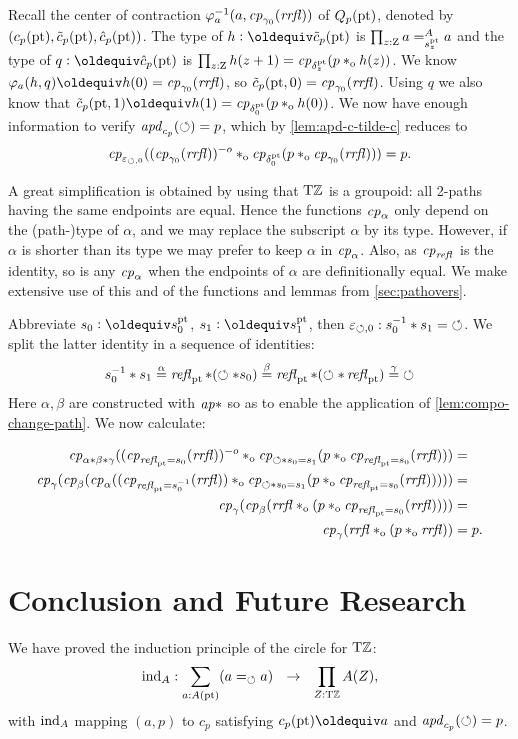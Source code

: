 \documentclass[a4paper,12pt]{amsart}
\begin{document}
Recall the center of contraction $\varphi_{a}^{-1}(a,\mathit{cp}_{\gamma_0}(\mathit{rrfl}))$
of $Q_p({\mathord{\mathrm{pt}}})$, denoted by $(c_p({\mathord{\mathrm{pt}}}),\tilde{c}_p({\mathord{\mathrm{pt}}}),\hat{c}_p({\mathord{\mathrm{pt}}}))$.
The type of $h\defeq\tilde{c}_p(\pt)$ is $\prod_{z:\mathrm{Z}} a =^A_{s^{\mathord{\mathrm{pt}}}_z} a$ and
the type of $q\defeq\hat{c}_p(\pt)$ is $\prod_{z:\mathrm{Z}} h(z+1) = \mathit{cp}_{\delta^{\mathord{\mathrm{pt}}}_z}(p *_{\mathrm{o}} h(z))$.
We know $\varphi_{a}(h,q) \jdeq h(0) = \cp{\gamma_0}(\rrfl)$, 
so $\tilde c_p({\mathord{\mathrm{pt}}},0) = \mathit{cp}_{\gamma_0}(\mathit{rrfl})$.
Using $q$ we also know that 
$\tilde c_p(\pt,1) \jdeq h(1) = \cp{\delta^\pt_0}(p \cto h(0))$.
We now have enough information to verify $\mathop{{\it apd}_{c_p}}(\circlearrowleft)=p$,
which by \cref{lem:apd-c-tilde-c} reduces to 
\[
\mathit{cp}_{\varepsilon_{\circlearrowleft,0}}
((\mathit{cp}_{\gamma_0}(\mathit{rrfl}))^{-o}*_{\mathrm{o}} 
\mathit{cp}_{\delta^{\mathord{\mathrm{pt}}}_0}(p *_{\mathrm{o}} \mathit{cp}_{\gamma_0}(\mathit{rrfl}))) = p.
\]

A great simplification is obtained by using that ${\mathrm{T}\mathbb{Z}}$ is a groupoid:
all 2-paths having the same endpoints are equal.
Hence the functions $\mathit{cp}_{\alpha}$ only depend on the (path-)type
of $\alpha$, and we may replace the subscript $\alpha$ by its type.
However, if $\alpha$ is shorter than its type we may 
prefer to keep $\alpha$ in $\mathit{cp}_{\alpha}$.
Also, as $\mathit{cp}_{\mathop{{\it refl}_{}}}$ is the identity, so is any $\mathit{cp}_{\alpha}$
when the endpoints of $\alpha$ are definitionally equal. 
We make extensive use of this and of the functions and
lemmas from \cref{sec:pathovers}.

Abbreviate $s_0 \defeq s^\pt_0$, $s_1 \defeq s^\pt_1$, 
then $\varepsilon_{\circlearrowleft,0} : s_0^{-1} * s_1 = {\circlearrowleft}$.
We split the latter identity in a sequence of identities:
\[
s_0^{-1} * s_1 \stackrel{\alpha}{=} 
\mathop{{\it refl}_{{\mathord{\mathrm{pt}}}}}*(\circlearrowleft* s_0) \stackrel{\beta}{=} 
\mathop{{\it refl}_{{\mathord{\mathrm{pt}}}}}*(\circlearrowleft*\mathop{{\it refl}_{{\mathord{\mathrm{pt}}}}})\stackrel{\gamma}{=} {\circlearrowleft}
\]
Here $\alpha,\beta$ are constructed with $\mathop{{\it ap}{*}}$ so as to
enable the application of \cref{lem:compo-change-path}.
We now calculate:

\begin{align*}
\mathit{cp}_{\alpha*\beta*\gamma}
((\mathit{cp}_{\mathop{{\it refl}_{{\mathord{\mathrm{pt}}}}} = s_0}(\mathit{rrfl}))^{-o} *_{\mathrm{o}}
   \mathit{cp}_{\circlearrowleft* s_0 = s_1}(p*_{\mathrm{o}}\mathit{cp}_{\mathop{{\it refl}_{{\mathord{\mathrm{pt}}}}} = s_0}(\mathit{rrfl})))&= \\
\mathit{cp}_{\gamma}(\mathit{cp}_{\beta}(\mathit{cp}_{\alpha}
((\mathit{cp}_{\mathop{{\it refl}_{{\mathord{\mathrm{pt}}}}} = s_0^{-1}}(\mathit{rrfl})) *_{\mathrm{o}}
   \mathit{cp}_{\circlearrowleft* s_0 = s_1}(p*_{\mathrm{o}}\mathit{cp}_{\mathop{{\it refl}_{{\mathord{\mathrm{pt}}}}} = s_0}(\mathit{rrfl})))))&= \\
\mathit{cp}_{\gamma}(\mathit{cp}_{\beta}
(\mathit{rrfl} *_{\mathrm{o}}
   (p*_{\mathrm{o}}\mathit{cp}_{\mathop{{\it refl}_{{\mathord{\mathrm{pt}}}}} = s_0}(\mathit{rrfl}))))&= \\
\mathit{cp}_{\gamma}(\mathit{rrfl}*_{\mathrm{o}}(p*_{\mathrm{o}}\mathit{rrfl}))&= p. 
\end{align*}

\section{Conclusion and Future Research}
We have proved the induction principle of the circle for ${\mathrm{T}\mathbb{Z}}$:
\[
{\mathop{\mathrm{ind}}}_A : \sum_{a:A({\mathord{\mathrm{pt}}})}(a=_\circlearrowleft a) ~~\to~~ \prod_{Z:{\mathrm{T}\mathbb{Z}}} A(Z),
\]
with ${\mathop{\mathrm{ind}}}_A$ mapping $(a,p)$ to $c_p$ satisfying $c_p(\pt) \jdeq a$ 
and $\mathop{{\it apd}_{c_p}}(\circlearrowleft) = p$.
\end{document}
